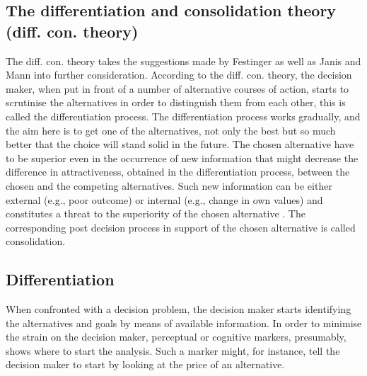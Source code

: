 \subsection{The differentiation and consolidation theory
  (diff. con. theory)}

The diff. con. theory \parencite{svensson92b, Svensson95} takes the
suggestions made by Festinger \parencite{festinger64} as well as Janis
and Mann \parencite{JanisMann77} into further consideration.  According to the
diff. con. theory, the decision maker, when put in front of a number
of alternative courses of action, starts to scrutinise the
alternatives in order to distinguish them from each other, this is
called the differentiation process.  The differentiation process works
gradually, and the aim here is to get one of the alternatives, not
only the best but so much better that the choice will stand solid in
the future. The chosen alternative have to be superior even in the
occurrence of new information that might decrease the difference in
attractiveness, obtained in the differentiation process,  between the
chosen and the competing alternatives.  Such new information can be
either external (e.g., poor outcome) or internal (e.g., change in own
values) and constitutes a threat to the superiority of the chosen
alternative \parencite{svensson92a}.  The corresponding post decision
process in support of the chosen alternative is called consolidation.


\subsection{Differentiation}

When confronted with a decision problem, the decision maker starts
identifying the alternatives and goals by means of available
information.  In order to minimise the strain on the decision maker,
perceptual or cognitive markers, presumably, shows where to start the
analysis.  Such a marker might, for instance, tell the decision maker
to start by looking at the price of an alternative.


